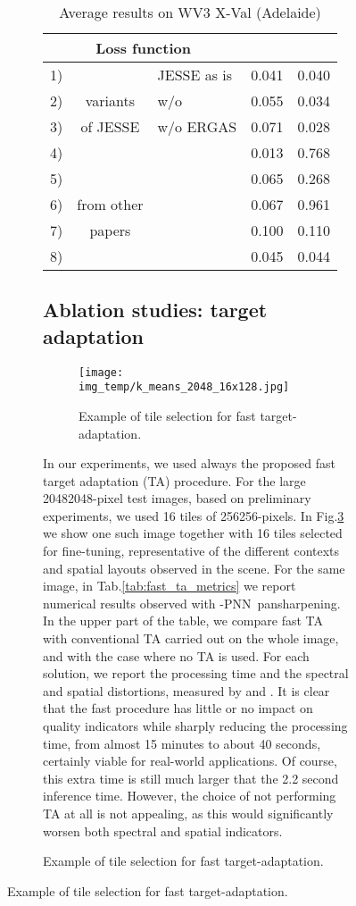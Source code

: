 \documentclass[journal]{IEEEtran}
\newcommand{\ru} {\rule{0mm}{3mm}}
\newcommand{\LPNN}  {-PNN}
\begin{document}
\begin{figure}
\begin{figure}
\begin{table}
\centering
\setlength{\tabcolsep}{3mm}
\begin{tabular}{l|c|l|cc} \hline
\multicolumn{3}{c}{\ru Loss function}                                  &    &    \\ \hline
1) &                        & \ru JESSE as is                          &  0.041  &  0.040  \\
2) & variants               & \ru w/o                            &  0.055  &  0.034  \\
3) & of JESSE               & \ru w/o ERGAS                            &  0.071  &  0.028  \\
4) &                        & \ru                        &  0.013  &  0.768  \\ \hline
5) &                        & \ru  \cite{Luo2020}       &  0.065  &  0.268  \\
6) & from other             & \ru  \cite{Uezato2020}    &  0.067  &  0.961  \\
7) & papers                 & \ru  \cite{Ma2020}         &  0.100  &  0.110  \\
8) &                        & \ru  \cite{Ciotola2022} &  0.045  &  0.044  \\ \hline
\end{tabular}
\caption{Average results on WV3 X-Val (Adelaide)}
\label{tab:loss_comparison}
\end{table}


\subsection{Ablation studies: target adaptation}

\begin{figure}
\centering
\texttt{[image: img\_temp/k\_means\_2048\_16x128.jpg]}
\caption{Example of tile selection for fast target-adaptation.}
\label{fig:k-means}
\end{figure}

In our experiments, we used always the proposed fast target adaptation (TA) procedure.
For the large 20482048-pixel test images, based on preliminary experiments, we used 16 tiles of 256256-pixels.
In Fig.\ref{fig:k-means} we show one such image together with 16 tiles selected for fine-tuning, representative of the different contexts and spatial layouts observed in the scene.
For the same image, in Tab.\ref{tab:fast_ta_metrics} we report numerical results observed with \LPNN\ pansharpening.
In the upper part of the table, we compare
fast TA with conventional TA carried out on the whole image, and with the case where no TA is used.
For each solution, we report the processing time and the spectral and spatial distortions, measured by  and .
It is clear that the fast procedure has little or no impact on quality indicators while sharply reducing the processing time,
from almost 15 minutes to about 40 seconds, certainly viable for real-world applications.
Of course, this extra time is still much larger that the 2.2 second inference time.
However, the choice of not performing TA at all is not appealing, as this would significantly worsen both spectral and spatial indicators.


\end{figure}
\end{figure}
\end{document}

